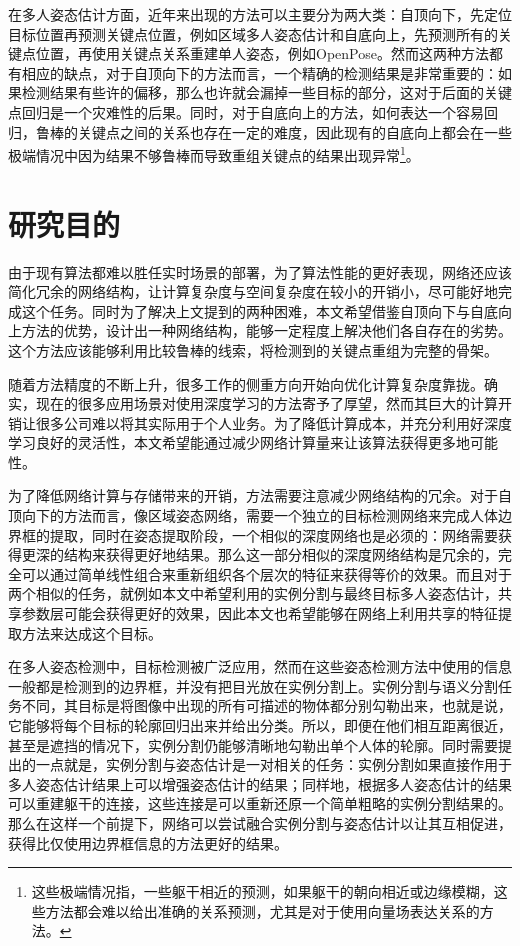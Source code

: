 在多人姿态估计方面，近年来出现的方法可以主要分为两大类：自顶向下，先定位目标位置再预测关键点位置，例如区域多人姿态估计\cite{fang2017rmpe}和自底向上，先预测所有的关键点位置，再使用关键点关系重建单人姿态，例如OpenPose\cite{Cao2016Realtime}。然而这两种方法都有相应的缺点，对于自顶向下的方法而言，一个精确的检测结果是非常重要的：如果检测结果有些许的偏移，那么也许就会漏掉一些目标的部分，这对于后面的关键点回归是一个灾难性的后果。同时，对于自底向上的方法，如何表达一个容易回归，鲁棒的关键点之间的关系也存在一定的难度，因此现有的自底向上都会在一些极端情况中因为结果不够鲁棒而导致重组关键点的结果出现异常\footnote{这些极端情况指，一些躯干相近的预测，如果躯干的朝向相近或边缘模糊，这些方法都会难以给出准确的关系预测，尤其是对于使用向量场表达关系的方法。}。

\section{研究目的}
\label{sec:generalmotivation}
由于现有算法都难以胜任实时场景的部署，为了算法性能的更好表现，网络还应该简化冗余的网络结构，让计算复杂度与空间复杂度在较小的开销小，尽可能好地完成这个任务。同时为了解决上文提到的两种困难，本文希望借鉴自顶向下与自底向上方法的优势，设计出一种网络结构，能够一定程度上解决他们各自存在的劣势。这个方法应该能够利用比较鲁棒的线索，将检测到的关键点重组为完整的骨架。

随着方法精度的不断上升，很多工作的侧重方向开始向优化计算复杂度靠拢。确实，现在的很多应用场景对使用深度学习的方法寄予了厚望，然而其巨大的计算开销让很多公司难以将其实际用于个人业务。为了降低计算成本，并充分利用好深度学习良好的灵活性，本文希望能通过减少网络计算量来让该算法获得更多地可能性。

为了降低网络计算与存储带来的开销，方法需要注意减少网络结构的冗余。对于自顶向下的方法而言，像区域姿态网络\cite{fang2017rmpe}，需要一个独立的目标检测网络来完成人体边界框的提取，同时在姿态提取阶段，一个相似的深度网络也是必须的：网络需要获得更深的结构来获得更好地结果。那么这一部分相似的深度网络结构是冗余的，完全可以通过简单线性组合来重新组织各个层次的特征来获得等价的效果。而且对于两个相似的任务，就例如本文中希望利用的实例分割与最终目标多人姿态估计，共享参数层可能会获得更好的效果，因此本文也希望能够在网络上利用共享的特征提取方法来达成这个目标。

在多人姿态检测中，目标检测被广泛应用，然而在这些姿态检测方法中使用的信息一般都是检测到的边界框，并没有把目光放在实例分割上。实例分割与语义分割任务不同，其目标是将图像中出现的所有可描述的物体都分别勾勒出来，也就是说，它能够将每个目标的轮廓回归出来并给出分类。所以，即便在他们相互距离很近，甚至是遮挡的情况下，实例分割仍能够清晰地勾勒出单个人体的轮廓。同时需要提出的一点就是，实例分割与姿态估计是一对相关的任务：实例分割如果直接作用于多人姿态估计结果上可以增强姿态估计的结果；同样地，根据多人姿态估计的结果可以重建躯干的连接，这些连接是可以重新还原一个简单粗略的实例分割结果的。那么在这样一个前提下，网络可以尝试融合实例分割与姿态估计以让其互相促进，获得比仅使用边界框信息的方法更好的结果。


